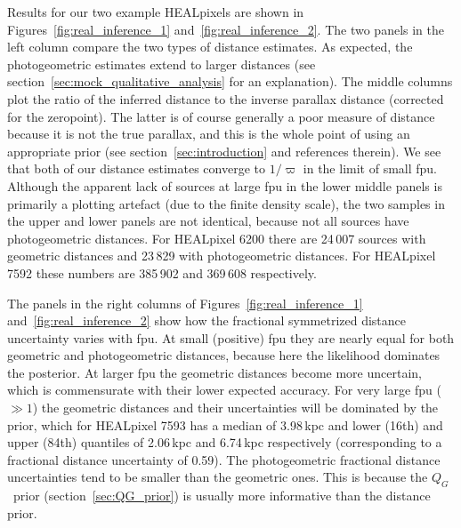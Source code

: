 \documentclass[twocolumn]{aastex62}
\providecommand{\QG}{\ensuremath{Q_G}}
\providecommand{\parallax}{\ensuremath{\varpi}}
\begin{document}
Results for our two example HEALpixels are shown in Figures~\ref{fig:real_inference_1} and~\ref{fig:real_inference_2}.
The two panels in the left column compare the two types of distance estimates. As expected, the photogeometric estimates extend to larger distances (see section~\ref{sec:mock_qualitative_analysis} for an explanation).
The middle columns plot the ratio of the inferred distance to the inverse parallax distance (corrected for the zeropoint). The latter is of course generally a poor measure of distance because it is not the true parallax, and this is the whole point of using an appropriate prior (see section~\ref{sec:introduction} and references therein). We see that both of our distance estimates converge to $1/\parallax$ in the limit of small fpu. 
Although the apparent lack of sources at large fpu in the lower middle panels is primarily a plotting artefact (due to the finite density scale), the two samples in the upper and lower panels are not identical, because not all sources have photogeometric distances.
For HEALpixel 6200 there are 24\,007 sources with geometric distances and  23\,829 with photogeometric distances. For HEALpixel 7592 these numbers are  385\,902 and 369\,608 respectively.

The panels in the right columns of Figures~\ref{fig:real_inference_1} and~\ref{fig:real_inference_2} show how the fractional symmetrized  distance uncertainty varies with fpu. At small (positive) fpu they are nearly equal for both geometric and photogeometric distances, because here the likelihood dominates the posterior. At larger fpu the geometric distances become more uncertain, which is commensurate with their lower expected accuracy. 
For very large fpu ($\gg 1$) the geometric distances and their uncertainties will be dominated by the prior, which for HEALpixel 7593 has a median of 3.98\,kpc and lower (16th) and upper (84th) quantiles of 2.06\,kpc and 6.74\,kpc respectively (corresponding to a fractional distance uncertainty of 0.59).
The photogeometric fractional distance uncertainties tend to be smaller than the geometric ones. This is because the \QG\ prior (section~\ref{sec:QG_prior}) is usually more informative than the distance prior. 
\end{document}
